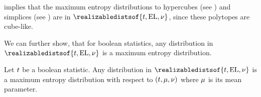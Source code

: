  implies that the maximum entropy distributions to hypercubes (see ) and simplices (see ) are in $\realizabledistsof{\hlnstat,\elgraph,\basemeasure}$, since these polytopes are cube-like.

We can further show, that for boolean statistics, any distribution in $\realizabledistsof{\hlnstat,\elgraph,\basemeasure}$ is a maximum entropy distribution.


\begin{theorem}
    Let $t$ be a boolean statistic.
    Any distribution in $\realizabledistsof{\hlnstat,\elgraph,\basemeasure}$ is a maximum entropy distribution with respect to $(t,\mu,\nu)$ where $\mu$ is its mean parameter.
\end{theorem}
